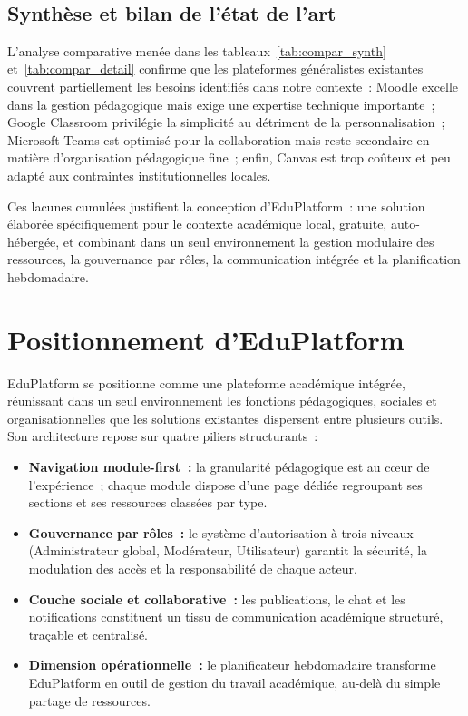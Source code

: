 ﻿﻿\documentclass[12pt,a4paper,oneside]{report}
\begin{document}

\subsection{Synth\`ese et bilan de l'\'etat de l'art}

L'analyse comparative men\'ee dans les tableaux~\ref{tab:compar_synth} et~\ref{tab:compar_detail} confirme que les plateformes g\'en\'eralistes existantes couvrent partiellement les besoins identifi\'es dans notre contexte~: Moodle excelle dans la gestion p\'edagogique mais exige une expertise technique importante~; Google Classroom privil\'egie la simplicit\'e au d\'etriment de la personnalisation~; Microsoft Teams est optimis\'e pour la collaboration mais reste secondaire en mati\`ere d'organisation p\'edagogique fine~; enfin, Canvas est trop co\^uteux et peu adapt\'e aux contraintes institutionnelles locales.

Ces lacunes cumul\'ees justifient la conception d'EduPlatform~: une solution \'elabor\'ee sp\'ecifiquement pour le contexte acad\'emique local, gratuite, auto-h\'eberg\'ee, et combinant dans un seul environnement la gestion modulaire des ressources, la gouvernance par r\^oles, la communication int\'egr\'ee et la planification hebdomadaire.

\section{Positionnement d'EduPlatform}
\label{sec:positionnement}

EduPlatform se positionne comme une plateforme acad\'emique int\'egr\'ee, r\'eunissant dans un seul environnement les fonctions p\'edagogiques, sociales et organisationnelles que les solutions existantes dispersent entre plusieurs outils. Son architecture repose sur quatre piliers structurants~:

\begin{itemize}
  \item \textbf{Navigation module-first~:} la granularit\'e p\'edagogique est au c\oe ur de l'exp\'erience~; chaque module dispose d'une page d\'edi\'ee regroupant ses sections et ses ressources class\'ees par type.
  \item \textbf{Gouvernance par r\^oles~:} le syst\`eme d'autorisation \`a trois niveaux (Administrateur global, Mod\'erateur, Utilisateur) garantit la s\'ecurit\'e, la modulation des acc\`es et la responsabilit\'e de chaque acteur.
  \item \textbf{Couche sociale et collaborative~:} les publications, le chat et les notifications constituent un tissu de communication acad\'emique structur\'e, tra\c{c}able et centralis\'e.
  \item \textbf{Dimension op\'erationnelle~:} le planificateur hebdomadaire transforme EduPlatform en outil de gestion du travail acad\'emique, au-del\`a du simple partage de ressources.
\end{itemize}
\end{document}
